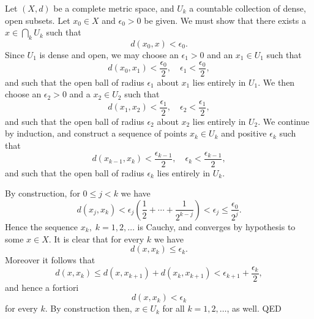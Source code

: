 \documentclass[12pt]{article}
\begin{document}
Let $(X,d)$ be a complete metric space, and $U_k$ a countable
collection of dense, open subsets.  Let $x_0\in X$ and $\epsilon_0>0$ be
given.  We must show that there exists a $x\in \bigcap_k U_k$ such that
$$d(x_0,x)<\epsilon_0.$$
Since $U_1$ is dense and open, we may choose an $\epsilon_1>0$ and an
$x_1\in U_1$ such that
$$d(x_0,x_1)<\frac{\epsilon_0}{2},\quad \epsilon_1<\frac{\epsilon_0}{2},$$
and  such that the open ball of
radius $\epsilon_1$ about $x_1$ lies entirely  
in $U_1$.  We then choose an $\epsilon_2>0$ and a $x_2\in U_2$ such that
$$d(x_1,x_2)<\frac{\epsilon_1}{2},\quad \epsilon_2<\frac{\epsilon_1}{2},$$
and  such that the open ball
of radius $\epsilon_2$ about $x_2$ lies 
entirely in $U_2$.  We continue by induction, and construct a sequence
of points $x_k\in U_k$ and positive $\epsilon_k$ such that
$$d(x_{k-1},x_k)<\frac{\epsilon_{k-1}}{2},\quad \epsilon_k<\frac{\epsilon_{k-1}}{2},$$
and such that the open
ball of radius $\epsilon_k$ lies entirely in $U_k$. 

By construction, for $0\leq j<k$ we have
$$d(x_j,x_k) < \epsilon_j \left(\frac{1}{2} + \cdots +
  \frac{1}{2^{k-j}}\right) < \epsilon_j \leq \frac{\epsilon_0}{2^j}.$$
Hence the
sequence $x_k, \; k=1,2,\ldots$ is Cauchy, and converges by hypothesis
to some $x\in X$.  It is  clear that for every $k$ we have
$$d(x,x_k) \leq \epsilon_k.$$
Moreover it follows that
$$d(x,x_k) \leq d(x,x_{k+1}) + d(x_{k},x_{k+1}) < \epsilon_{k+1} +
\frac{\epsilon_{k}}{2},$$
and hence a fortiori
$$d(x,x_k)<\epsilon_k$$
for every $k$.  By construction then, $x\in
U_k$ for all $k=1,2,\ldots$, as well.  QED
\end{document}
